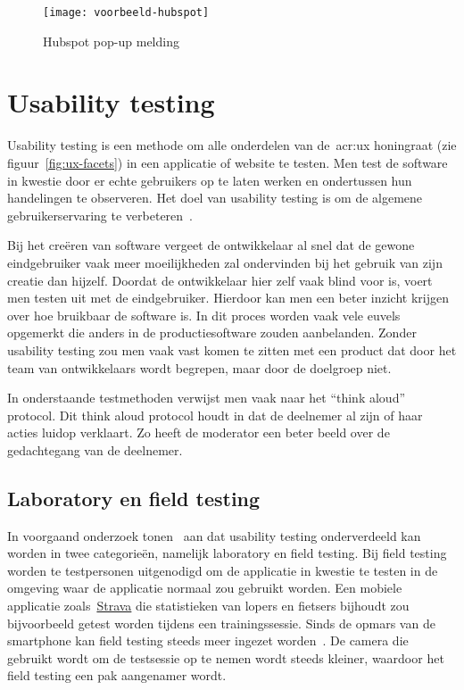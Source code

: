 \begin{figure}
    \centering
    \texttt{[image: voorbeeld-hubspot]}
    \caption[Voorbeeld Hubspot]{Hubspot pop-up melding}
    \label{fig:ux-voorbeeld-hubspot}
\end{figure}

\section{Usability testing}
\label{sec:usability-testing}

Usability testing is een methode om alle onderdelen van de~\acrlong{acr:ux} honingraat (zie figuur~\ref{fig:ux-facets}) in een applicatie of website te testen. Men test de software in kwestie door er echte gebruikers op te laten werken en ondertussen hun handelingen te observeren. Het doel van usability testing is om de algemene gebruikerservaring te verbeteren~\autocite{Hotjar2020}.

Bij het creëren van software vergeet de ontwikkelaar al snel dat de gewone eindgebruiker vaak meer moeilijkheden zal ondervinden bij het gebruik van zijn creatie dan hijzelf. Doordat de ontwikkelaar hier zelf vaak blind voor is, voert men testen uit met de eindgebruiker. Hierdoor kan men een beter inzicht krijgen over hoe bruikbaar de software is. In dit proces worden vaak vele euvels opgemerkt die anders in de productiesoftware zouden aanbelanden.
Zonder usability testing zou men vaak vast komen te zitten met een product dat door het team van ontwikkelaars wordt begrepen, maar door de doelgroep niet.

In onderstaande testmethoden verwijst men vaak naar het ``think aloud'' protocol. Dit think aloud protocol houdt in dat de deelnemer al zijn of haar acties luidop verklaart. Zo heeft de moderator een beter beeld over de gedachtegang van de deelnemer.

\subsection{Laboratory en field testing}
\label{sec:usability-testing:lab-field-testing}

In voorgaand onderzoek tonen~\textcite{Kaikkonen2005} aan dat usability testing onderverdeeld kan worden in twee categorieën, namelijk laboratory en field testing. Bij field testing worden te testpersonen uitgenodigd om de applicatie in kwestie te testen in de omgeving waar de applicatie normaal zou gebruikt worden. Een mobiele applicatie zoals~\href{https://www.strava.com/}{Strava} die statistieken van lopers en fietsers bijhoudt zou bijvoorbeeld getest worden tijdens een trainingssessie. Sinds de opmars van de smartphone kan field testing steeds meer ingezet worden~\autocite{Kjeldskov2004}. De camera die gebruikt wordt om de testsessie op te nemen wordt steeds kleiner, waardoor het field testing een pak aangenamer wordt.

